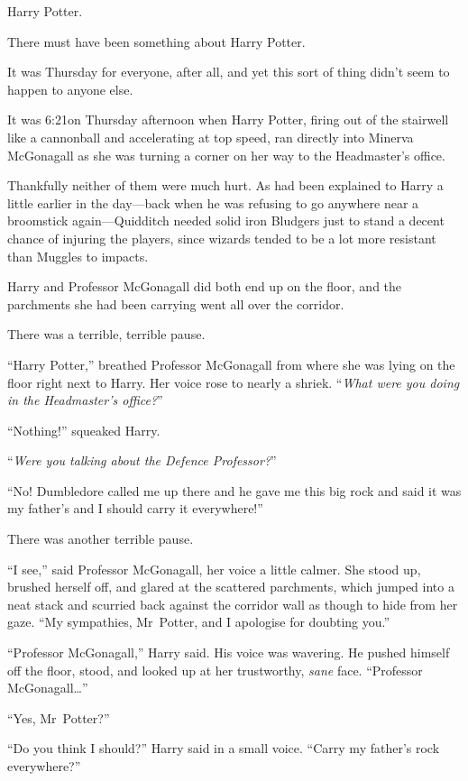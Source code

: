 \later

Harry Potter.

There must have been something about Harry Potter.

It was Thursday for everyone, after all, and yet this sort of thing didn’t seem to happen to anyone else.

It was 6:21\pm on Thursday afternoon when Harry Potter, firing out of the stairwell like a cannonball and accelerating at top speed, ran directly into Minerva McGonagall as she was turning a corner on her way to the Headmaster’s office.

Thankfully neither of them were much hurt. As had been explained to Harry a little earlier in the day—back when he was refusing to go anywhere near a broomstick again—Quidditch needed solid iron Bludgers just to stand a decent chance of injuring the players, since wizards tended to be a lot more resistant than Muggles to impacts.

Harry and Professor McGonagall did both end up on the floor, and the parchments she had been carrying went all over the corridor.

There was a terrible, terrible pause.

“Harry Potter,” breathed Professor McGonagall from where she was lying on the floor right next to Harry. Her voice rose to nearly a shriek. “\emph{What were you doing in the Headmaster’s office?}”

“Nothing!” squeaked Harry.

“\emph{Were you talking about the Defence Professor?}”

“No! Dumbledore called me up there and he gave me this big rock and said it was my father’s and I should carry it everywhere!”

There was another terrible pause.

“I see,” said Professor McGonagall, her voice a little calmer. She stood up, brushed herself off, and glared at the scattered parchments, which jumped into a neat stack and scurried back against the corridor wall as though to hide from her gaze. “My sympathies, Mr~Potter, and I apologise for doubting you.”

“Professor McGonagall,” Harry said. His voice was wavering. He pushed himself off the floor, stood, and looked up at her trustworthy, \emph{sane} face. “Professor McGonagall…”

“Yes, Mr~Potter?”

“Do you think I should?” Harry said in a small voice. “Carry my father’s rock everywhere?”

